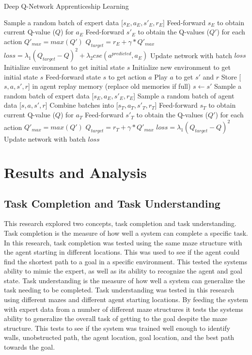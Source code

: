 \documentclass[12pt,american]{report}
\begin{document}
\begin{algorithm}
\caption{Deep Q-Network Apprenticeship Learning}
\label{alg:dqn-al-alg}
\begin{algorithmic} 
\State Sample a random batch of expert data [$s_E,a_E,s'_E,r_E$]
\State Feed-forward $s_E$ to obtain current Q-value ($Q$) for $a_E$
\State Feed-forward $s'_E$ to obtain the Q-values ($Q'$) for each action
\State $Q'_{max} = max(Q')$
\State $Q_{target} = r_E + \gamma *Q'_{max}$
\State $loss =\lambda_{1}(Q_{target}-Q)^2 + \lambda_{2}cse(a^{predicted},a_E)$
\State Update network with batch $loss$
\EndFor
\State Initialize environment to get initial state $s$
\State Initialize new environment to get initial state $s$
\EndIf
\State Feed-forward state $s$ to get action $a$
\State Play $a$ to get $s'$ and $r$
\State Store [$s,a,s',r$] in agent replay memory (replace old memories if full)
\State $s \leftarrow s'$
\State Sample a random batch of expert data [$s_E,a_E,s'_E,r_E$]
\State Sample a random batch of agent data [$s,a,s',r$]
\State Combine batches into [$s_T,a_T,s'_T,r_T$]
\State Feed-forward $s_T$ to obtain current Q-value ($Q$) for $a_T$
\State Feed-forward $s'_T$ to obtain the Q-values ($Q'$) for each action
\State $Q'_{max} = max(Q')$
\State $Q_{target} = r_T + \gamma *Q'_{max}$
\State $loss =\lambda_{1}(Q_{target}-Q)^2$
\State Update network with batch $loss$
\EndIf
\EndFor
\end{algorithmic}
\end{algorithm}

\chapter{Results and Analysis}
\label{sec:results_and_analysis}
\section{Task Completion and Task Understanding}
This research explored two concepts, task completion and task understanding. Task completion is the measure of how well a system can complete a specific task.  In this research, task completion was tested using the same maze structure with the agent starting in different locations.  This was used to see if the agent could find the shortest path to a goal in a specific environment.  This tested the systems ability to mimic the expert, as well as its ability to recognize the agent and goal state.  
Task understanding is the measure of how well a system can generalize the task needing to be completed. Task understanding was tested in this research using different mazes and different agent starting locations.  By feeding the system with expert data from a number of different maze structures it tests the systems ability to generalize the overall task of getting to the goal despite the maze structure.  This tests to see if the system was trained well enough to identify walls, unobstructed path, the agent location, goal location, and the best path towards the goal.
\end{document}

